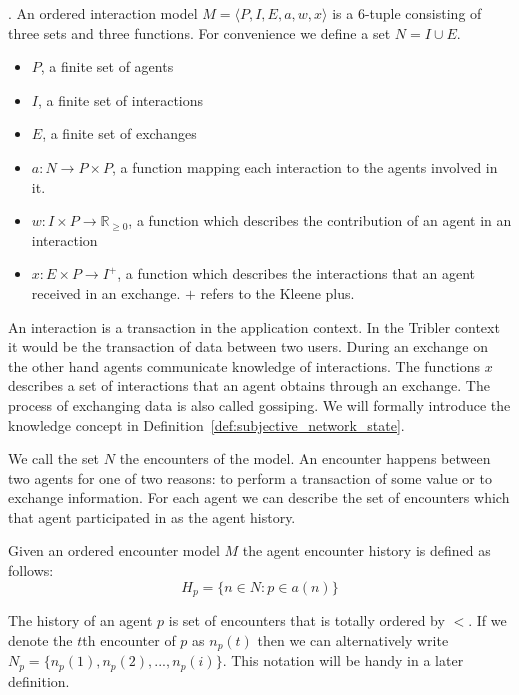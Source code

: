\begin{defn}. 
    \label{def:base}
    An ordered interaction model $M = \langle P, I, E, a, w, x \rangle$ is a 6-tuple consisting
     of three sets and three functions. For convenience we define a set $N = I \cup E$. 
    \begin{itemize}
        \item $P$, a finite set of agents
        \item $I$, a finite set of interactions
        \item $E$, a finite set of exchanges
        \item $a : N \rightarrow P \times P$, a function mapping each interaction to the agents 
        involved in it.
        \item $w : I \times P \rightarrow \mathbb{R}_{\geq0}$, a function which describes the 
        contribution of an agent in an interaction
        \item $x : E \times P \rightarrow I^+$, a function which describes the interactions that an 
        agent received in an exchange. $+$ refers to the Kleene plus.
    \end{itemize}
\end{defn}

An interaction is a transaction in the application context. In the Tribler context it would be the 
transaction of data between two users. During an exchange on the other hand agents communicate knowledge
of interactions. The functions $x$ describes a set of interactions that an agent obtains through an 
exchange. The process of exchanging data is also called gossiping. We will formally introduce the 
knowledge concept in Definition~\ref{def:subjective_network_state}.

We call the set $N$ the encounters of the model. An encounter happens between two agents for one of
two reasons: to perform a transaction of some value or to exchange information. For each agent we 
can describe the set of encounters which that agent participated in as the agent history. 

\begin{defn}
    Given an ordered encounter model $M$ the agent encounter history is defined as follows:
    \begin{equation}
        H_p = \{ n \in N : p \in a(n) \}
    \end{equation}
\end{defn}


The history of an agent $p$ is set of encounters that is totally ordered by $<$. If we denote the 
$t$th encounter of $p$ as $n_p(t)$ then we can alternatively write $N_p = \{ n_p(1), n_p(2), ..., n_p(i)\}$.
This notation will be handy in a later definition.

